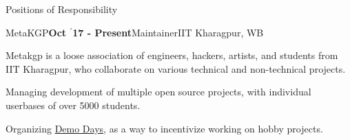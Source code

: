 \documentclass{resume} %
\begin{document}
\begin{rSection}{Positions of Responsibility}

\begin{rSubsection}{\large MetaKGP}{\textbf{\large Oct $^{\prime}$17 - Present}}{Maintainer}{IIT Kharagpur, WB}
\item Metakgp is a loose association of engineers, hackers, artists, and students from IIT Kharagpur, who collaborate on various technical and non-technical projects.
\item Managing development of multiple open source projects, with individual userbases of over 5000 students.
\item Organizing \href{https://www.youtube.com/watch?v=srH_yJJFK80&list=PLxBVN59ffbfKmADdIpkNCs4jfxJ-Nyhqx}{Demo Days}, as a way to incentivize working on hobby projects.
\end{rSubsection}





\end{rSection}

\end{document}
